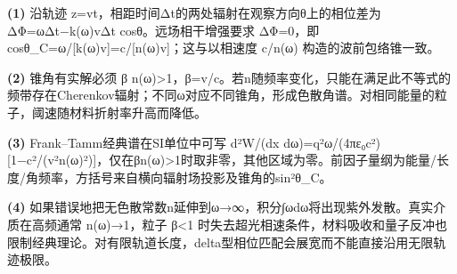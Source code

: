 \par\noindent\textbf{(1)} 沿轨迹 z=vt，相距时间Δt的两处辐射在观察方向θ上的相位差为 ΔΦ=ωΔt−k(ω)vΔt cosθ。远场相干增强要求 ΔΦ=0，即 cosθ\_C=ω/[k(ω)v]=c/[n(ω)v]；这与以相速度 c/n(ω) 构造的波前包络锥一致。
\par\noindent\textbf{(2)} 锥角有实解必须 β n(ω)>1，β=v/c。若n随频率变化，只能在满足此不等式的频带存在Cherenkov辐射；不同ω对应不同锥角，形成色散角谱。对相同能量的粒子，阈速随材料折射率升高而降低。
\par\noindent\textbf{(3)} Frank–Tamm经典谱在SI单位中可写 d²W/(dx dω)=q²ω/(4πε₀c²)[1−c²/(v²n(ω)²)]，仅在βn(ω)>1时取非零，其他区域为零。前因子量纲为能量/长度/角频率，方括号来自横向辐射场投影及锥角的sin²θ\_C。
\par\noindent\textbf{(4)} 如果错误地把无色散常数n延伸到ω→∞，积分∫ωdω将出现紫外发散。真实介质在高频通常 n(ω)→1，粒子 β<1 时失去超光相速条件，材料吸收和量子反冲也限制经典理论。对有限轨道长度，delta型相位匹配会展宽而不能直接沿用无限轨迹极限。
